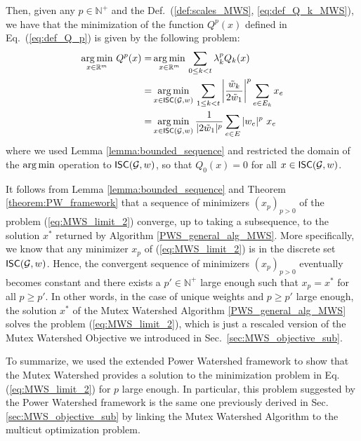 \noindent Then, given any $p\in \mathbb{N}^+$ and the Def.~(\ref{def:scales_MWS}, \ref{eq:def_Q_k_MWS}), we have that the minimization of the function $Q^p(x)$ defined in Eq.~(\ref{eq:def_Q_p}) is given by the following problem:
\begin{align}
\operatorname*{arg\,min}_{x\in \mathbb{R}^m} \, Q^p(x) = & \operatorname*{arg\,min}_{x\in \mathbb{R}^m} \, \sum_{0\leq k< t} \lambda^p_k Q_k (x) \label{eq:MWS_limit_1} \\
= & \operatorname*{arg\,min}_{x\in \mathsf{ISC}(\mathcal{G},w)} \, \sum_{1 \leq k < t} \left | \frac{\tilde{w}_k}{2\tilde{w}_1} \right |^p \sum_{e\in E_{k}} x_e  \\
 = & \operatorname*{arg\,min}_{x\in \mathsf{ISC}(\mathcal{G},w)} \frac{1}{|2\tilde{w}_1|^p} \sum_{e \in E} |w_e|^p \,\,x_e \label{eq:MWS_limit_2}
\end{align}
where we used Lemma \ref{lemma:bounded_sequence} and restricted the domain of the $\operatorname*{arg\,min}$ operation to $\mathsf{ISC}(\mathcal{G},w)$, so that $Q_0(x)=0$ for all $x\in \mathsf{ISC}(\mathcal{G},w)$.

It follows from Lemma \ref{lemma:bounded_sequence} and Theorem \ref{theorem:PW_framework} that a sequence of minimizers $(x_p)_{p>0}$ of the problem (\ref{eq:MWS_limit_2}) converge, up to taking a subsequence, to the solution $x^*$ returned by Algorithm \ref{PWS_general_alg_MWS}. 
More specifically, we know that any minimizer $x_p$ of (\ref{eq:MWS_limit_2}) is in the discrete set $\mathsf{ISC}(\mathcal{G},w)$. Hence, the convergent sequence of minimizers $(x_p)_{p>0}$ eventually becomes constant and there exists a $p'\in \mathbb{N}^+$ large enough such that $x_p=x^*$ for all $p\geq p'$. In other words, in the case of unique weights and $p\geq p'$ large enough, the solution $x^*$ of the Mutex Watershed Algorithm \ref{PWS_general_alg_MWS} solves the problem (\ref{eq:MWS_limit_2}), which is just a rescaled version of the Mutex Watershed Objective we introduced in Sec.~\ref{sec:MWS_objective_sub}.

 To summarize, we used the extended Power Watershed framework to show that the Mutex Watershed provides a solution to the minimization problem in Eq. (\ref{eq:MWS_limit_2}) for $p$ large enough. In particular, this problem suggested by the Power Watershed framework is the same one previously derived in Sec. \ref{sec:MWS_objective_sub} by linking the Mutex Watershed Algorithm to the multicut optimization problem.



